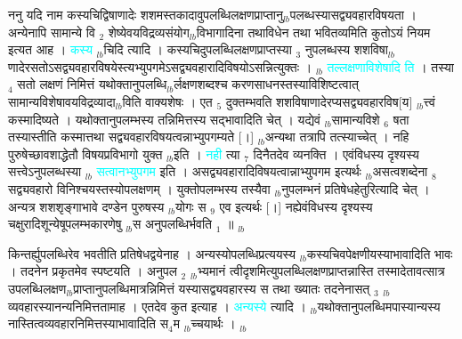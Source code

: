 \documentclass[article,12pt,a4paper]{memoir}%
\newcommand{\quotelemma}[1]{\textcolor{cyan}{#1}}
\newcounter{parCount}
\begin{document}
	  
	  \pstart \leavevmode%
	ननु यदि नाम कस्यचिद्विषाणादेः शशमस्तकादावुपलब्धिलक्षणप्राप्तानु{\tiny $_{lb}$}पलब्धस्यासद्व्यवहारविषयता । अन्येनापि सामान्ये वि {\tiny $_{2}$} शेष्येवयविद्रव्यसंयोग{\tiny $_{lb}$}विभागादिना तथाविधेन तथा भवितव्यमिति कुतोऽयं नियम इत्यत आह । \quotelemma{कस्य} {\tiny $_{lb}$}चिदि \cite[2b1]{vn-msN} त्यादि । कस्यचिदुपलब्धिलक्षणप्राप्तस्या {\tiny $_{3}$} नुपलब्धस्य शशविषा{\tiny $_{lb}$}णादेरसतोऽसद्व्यवहारविषयेस्त्यभ्युपगमेऽसद्व्यवहारादिविषयोऽसन्नित्युक्तः । {\tiny $_{lb}$} \quotelemma{तल्लक्षणाविशेषादि \cite[2b1]{vn-msN} ति} । तस्या {\tiny $_{4}$} सतो लक्षणं निमित्तं यथोक्तानुपलब्धि{\tiny $_{lb}$}र्लक्षणशब्दश्च करणसाधनस्तस्याविशिष्टत्वात् सामान्यविशेषावयविद्रव्यादा{\tiny $_{lb}$}विति वाक्यशेषः । एत {\tiny $_{5}$} दुक्तम्भवति शशविषाणादेरप्यसद्व्यवहारविष[य] {\tiny $_{lb}$}त्त्वं कस्मादिष्यते । यथोक्तानुपलम्भस्य तन्निमित्तस्य सद्भावादिति चेत् । यद्येवं {\tiny $_{lb}$}सामान्यविशे {\tiny $_{6}$} षता तस्यास्तीति कस्मात्तथा सद्व्यवहारविषयत्वन्नाभ्युपगम्यते [।] {\tiny $_{lb}$}अन्यथा तत्रापि तत्स्याच्चेत् । नहि पुरुषेच्छावशाद्धेतौ विषयप्रविभागो युक्त {\tiny $_{lb}$}इति । \quotelemma{नही} \cite[2b1]{vn-msN} त्या {\tiny $_{7}$} दिनैतदेव व्यनक्ति । एवंविधस्य दृश्यस्य सत्त्वेऽनुपलब्धस्या {\tiny $_{lb}$} \quotelemma{सत्वानभ्युपगम} \cite[2b1]{vn-msN} इति । असद्व्यवहारादिविषयत्वान्नाभ्युपगम इत्यर्थः {\tiny $_{lb}$}असत्वशब्देना {\tiny $_{8}$} सद्व्यवहारो विनिश्चयस्तस्योपलक्षणम् । युक्तोपलम्भस्य तस्यैवा {\tiny $_{lb}$}नुपलम्भनं प्रतिषेधहेतुरित्यादि चेत् । अन्यत्र शशशृङ्गाभावे दण्डेन पुरुषस्य  {\tiny $_{lb}$}योगः स {\tiny $_{9}$} \leavevmode{} एव इत्यर्थः [।] नह्येवंविधस्य दृश्यस्य चक्षुरादिशून्येषूपलम्भकारणेषु {\tiny $_{lb}$}स अनुपलब्धिर्भवति {\tiny $_{1}$} ॥
	{}
	\pend%
      {\tiny $_{lb}$}

	  
	  \pstart \leavevmode%
	किन्तर्ह्युपलब्धिरेव भवतीति प्रतिषेधद्वयेनाह । अन्यस्योपलब्धिप्रत्ययस्य {\tiny $_{lb}$}कस्यचिवपेक्षणीयस्याभावादिति भावः । तदनेन प्रकृतमेव स्पष्टयति । अनुपल {\tiny $_{2}$} {\tiny $_{lb}$}भ्यमानं त्वीदृशमित्युपलब्धिलक्षणप्राप्तन्नास्ति तस्मादेतावत्सात्र उपलब्धिलक्षण{\tiny $_{lb}$}प्राप्तानुपलब्धिमात्रन्निमित्तं यस्यासद्व्यवहारस्य स तथा ख्यातः तदनेनासत् {\tiny $_{3}$} {\tiny $_{lb}$} \leavevmode{} व्यवहारस्यानन्यनिमित्ततामाह । एतदेव कुत इत्याह । \quotelemma{अन्यस्ये} \cite[2b2]{vn-msN} त्यादि । {\tiny $_{lb}$}यथोक्तानुपलब्धिमपास्यान्यस्य नास्तित्वव्यवहारनिमित्तस्याभावादिति स{\tiny $_{4}$}म {\tiny $_{lb}$}च्चयार्थः ।
	{}
	\pend%
      {\tiny $_{lb}$}
\end{document}
